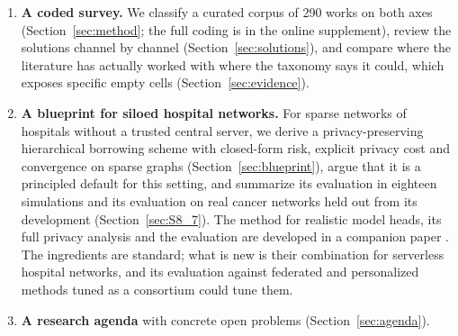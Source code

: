 \documentclass[acmsmall,screen,review]{acmart}
\newcommand{\eff}{\mathrm{eff}}
\theoremstyle{acmdefinition}
\begin{document}
\begin{enumerate}[leftmargin=*]
\begin{figure}[t]
\caption{Structure of the paper. The definition of Section~\ref{sec:definition} produces the two axes of the taxonomy, which serve as the coding scheme of the survey and shape the design of the blueprint.}
\label{fig:structure}
\end{figure}
\item \textbf{A coded survey.} We classify a curated corpus of 290 works on both axes (Section~\ref{sec:method}; the full coding is in the online supplement), review the solutions channel by channel (Section~\ref{sec:solutions}), and compare where the literature has actually worked with where the taxonomy says it could, which exposes specific empty cells (Section~\ref{sec:evidence}).
\item \textbf{A blueprint for siloed hospital networks.} For sparse networks of hospitals without a trusted central server, we derive a privacy-preserving hierarchical borrowing scheme with closed-form risk, explicit privacy cost and convergence on sparse graphs (Section~\ref{sec:blueprint}), argue that it is a principled default for this setting, and summarize its evaluation in eighteen simulations and its evaluation on real cancer networks held out from its development (Section~\ref{sec:S8_7}). The method for realistic model heads, its full privacy analysis and the evaluation are developed in a companion paper \cite{simoes2026ghb}. The ingredients are standard; what is new is their combination for serverless hospital networks, and its evaluation against federated and personalized methods tuned as a consortium could tune them.
\item \textbf{A research agenda} with concrete open problems (Section~\ref{sec:agenda}).
\end{enumerate}
\end{document}
